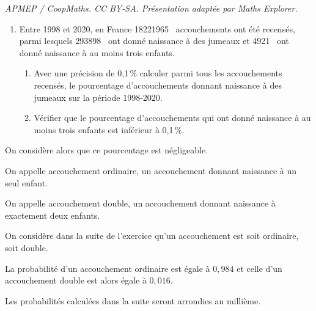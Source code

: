 \documentclass[10pt]{article}
\providecommand{\np}[2][]{{#2~#1}}
\begin{document}
\noindent\textit{APMEP / CoopMaths. CC BY-SA. Présentation adaptée par Maths Explorer.}\par\medskip
\medskip

\begin{enumerate}
\item Entre 1998 et 2020, en France \np{18221965} accouchements ont été recensés, parmi lesquels
\np{293898} ont donné naissance à des jumeaux et \np{4921} ont donné naissance à au moins trois enfants.
	\begin{enumerate}
		\item Avec une précision de 0,1\,\% calculer parmi tous les accouchements recensés, le pourcentage d'accouchements donnant naissance à des jumeaux sur la période 1998-2020.
		\item Vérifier que le pourcentage d'accouchements qui ont donné naissance à au moins trois enfants est inférieur à 0,1\,\%.
\end{enumerate}
\end{enumerate}

On considère alors que ce pourcentage est négligeable.

On appelle accouchement ordinaire, un accouchement donnant naissance à un seul enfant.

On appelle accouchement double, un accouchement donnant naissance à exactement deux enfants.

On considère dans la suite de l'exercice qu'un accouchement est soit ordinaire, soit double.

La probabilité d'un accouchement ordinaire est égale à $0,984$ et celle d'un accouchement double est alors égale à $0,016$.

Les probabilités calculées dans la suite seront arrondies au millième.
\end{document}
